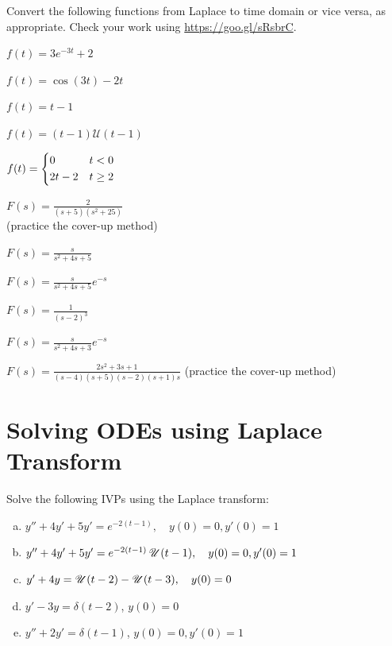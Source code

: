     \begin{question}
      Convert the following functions from Laplace to time domain or vice versa, as appropriate. Check your work using \url{https://goo.gl/sRsbrC}.
      \begin{fullwidth}
        \begin{colenumerate}[2]
          \item  \(f(t) = 3 e^{-3t} + 2\)
          \item  \(f(t) = \cos(3t) - 2t\)
          \item  \(f(t) = t - 1\)
          \item  \(f(t) = (t-1)\mathcal{U}(t-1)\)
          \item  \(f(t) = \begin{dcases} 0 & t < 0 \\ 2t-2 & t \geq 2 \end{dcases}\)
          \item  \(F(s) = \frac{2}{(s+5)(s^{2}+25)}\) \\{\scriptsize (practice the cover-up method)}
          \item  \(F(s) = \frac{s}{s^{2} + 4s + 5}\)
          \item  \(F(s) = \frac{s}{s^{2} + 4s + 5} e^{-s}\)
          \item  \(F(s) = \frac{1}{(s-2)^{3}}\)
          \item  \(F(s) = \frac{s}{s^{2} + 4s + 3} e^{-s}\)
          \item  \(F(s) = \frac{2s^{2} + 3s + 1}{(s-4)(s+5)(s-2)(s+1)s}\) {\scriptsize (practice the cover-up method)}
        \end{colenumerate}
      \end{fullwidth}
    \end{question}



  \section{Solving ODEs using Laplace Transform}

    \begin{question}
      Solve the following IVPs using the Laplace transform:
      \begin{enumerate}[(a)]
        \item \( y'' + 4y' + 5y' = e^{-2(t-1)}, \quad  y(0) = 0, y'(0) = 1 \)
        \item \( y'' + 4y' + 5y' = e^{-2(t-1)}\operatorname{\mathscr{U}}(t-1), \quad   y(0) = 0, y'(0) = 1 \)
        \item \( y' + 4y  = \operatorname{\mathscr{U}}(t-2) - \operatorname{\mathscr{U}}(t-3), \quad  y(0) = 0 \)
        \item $y'-3y=\delta(t-2)$, $y(0) = 0$
        \item $y''+2y'=\delta(t-1)$, $y(0) = 0, y'(0)=1$
      \end{enumerate}
    \end{question}



